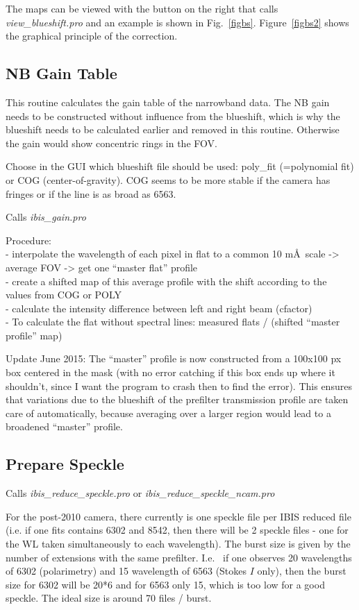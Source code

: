 \documentclass[a4paper,11pt]{article}
\begin{document}
The maps can be viewed with the button on the right that calls \textit{view\_blueshift.pro} and an example is shown in Fig.~\ref{figbs}. Figure~\ref{figbs2} shows the graphical principle of the correction.


\subsection{NB Gain Table}
This routine calculates the gain table of the narrowband data. The NB gain needs to be constructed without influence from the blueshift, which is why the blueshift needs to be calculated earlier and removed in this routine. Otherwise the gain would show concentric rings in the FOV.

Choose in the GUI which blueshift file should be used: poly\_fit (=polynomial fit) or COG (center-of-gravity). COG seems to be more stable if the camera has fringes or if the line is as broad as 6563.

Calls \textit{ibis\_gain.pro}

Procedure:\\
 - interpolate the wavelength of each pixel in flat to a common 10 m\AA\ scale -> average FOV -> get one ``master flat'' profile\\
 - create a shifted map of this average profile with the shift according to the values from COG or POLY\\
-  calculate the intensity difference between left and right beam (cfactor)\\
-  To calculate the flat without spectral lines: measured flats / (shifted ``master profile'' map)


Update June 2015: The ``master'' profile is now constructed from a 100x100 px box centered in the mask (with no error catching if this box ends up where it shouldn't, since I want the program to crash then to find the error). This ensures that variations due to the blueshift of the prefilter transmission profile are taken care of automatically, because averaging over a larger region would lead to a broadened ``master'' profile.

\subsection{Prepare Speckle}
\label{prepspeckle}
Calls \textit{ibis\_reduce\_speckle.pro} or \textit{ibis\_reduce\_speckle\_ncam.pro} 

For the post-2010 camera, there currently is one speckle file per IBIS reduced file (i.e. if one fits contains 6302 and 8542, then there will be 2 speckle files - one for the WL taken simultaneously to each wavelength). The burst size is given by the number of extensions with the same prefilter. I.e.~ if one observes 20 wavelengths of 6302 (polarimetry) and 15 wavelength of 6563 (Stokes $I$ only), then the burst size for 6302 will be 20*6 and for 6563 only 15, which is too low for a good speckle. The ideal size is around 70 files / burst.
\end{document}
